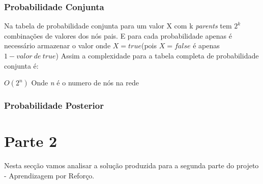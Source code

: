 \documentclass[9pt, a4paper, twocolumn]{article}
\begin{document}
\subsubsection{Probabilidade Conjunta}
\hspace{10mm}Na tabela de probabilidade conjunta para um valor X com k \textit{parents} tem $2^k$ combinações de valores dos nós pais.
E para cada probabilidade apenas é necessário armazenar o valor onde $X=true$(pois $X=false$ é apenas $1-valor\ de\ true$)
Assim a complexidade para a tabela completa de probabilidade conjunta é:
\begin{center}
$O(2^n)$ Onde \textit{n} é o numero de nós na rede
\end{center}
\subsubsection{Probabilidade Posterior}

\section{Parte 2}
\hspace{10mm}Nesta secção vamos analisar a solução produzida para a segunda parte do projeto - Aprendizagem por Reforço.
\end{document}
